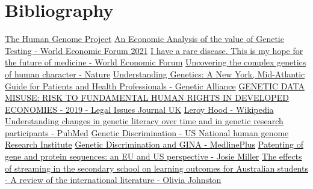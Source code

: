 \documentclass[12pt]{article}
\begin{document}
\newpage
\section{Bibliography}
\begin{thebibliography}{10}
\href{https://www.genome.gov/human-genome-project}{The Human Genome Project}
\href{https://www3.weforum.org/docs/WEF_An_Economic_Analysis_of_the_Value_of_Genetic_Testing_2021.pdf}{An Economic Analysis of the value of Genetic Testing - World Economic Forum 2021}
\href{https://www.weforum.org/agenda/2019/05/rare-diseases-arent-rare-but-treatments-for-them-are-its-time-to-change-that}{I have a rare disease. This is my hope for the future of medicine - World Economic Forum}
\href{https://www.nature.com/articles/s41380-018-0263-6}{Uncovering the complex genetics of human character - Nature}
\href{https://www.ncbi.nlm.nih.gov/books/NBK115568/}{Understanding Genetics: A New York, Mid-Atlantic Guide for Patients and Health Professionals - Genetic Alliance}
\href{https://www.legalissuesjournal.com/wp-content/uploads/2019/01/Selita-Genetic-Data-Misuse-Risk-to-Fundamental-Human-Rights-in-Developed-Economies.pdf}{GENETIC DATA MISUSE: RISK TO FUNDAMENTAL HUMAN RIGHTS IN DEVELOPED ECONOMIES - 2019 - Legal Issues Journal UK}
\href{https://en.wikipedia.org/wiki/Leroy_Hood}{Leroy Hood - Wikipedia}
\href{https://pubmed.ncbi.nlm.nih.gov/36417915/}{Understanding changes in genetic literacy over time and in genetic research participants - PubMed}
\href{https://www.genome.gov/about-genomics/policy-issues/Genetic-Discrimination}{Genetic Discrimination - US National human genome Research Institute}
\href{https://medlineplus.gov/genetics/understanding/testing/discrimination}{Genetic Discrimination and GINA - MedlinePlus}
\href{https://www.taylorwessing.com/synapse/ti-patenting-gene-sequences.html}{Patenting of gene and protein sequences: an EU and US perspective - Josie Miller}
\href{https://www.researchgate.net/publication/297661889_The_effects_of_streaming_in_the_secondary_school_on_learning_outcomes_for_Australian_students_-_A_review_of_the_international_literature}{The effects of streaming in the secondary school on learning outcomes for Australian students - A review of the international literature - Olivia Johnston}

\end{thebibliography}
\end{document}
